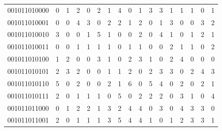 \documentclass[10pt,a4paper]{article}
\begin{document}
\begin{longtable}{ |c|c|c|c|c|c|c|c|c|c|c|c|c|c|c|c|c| }
    001011010000              & 0                            & 1                                & 2                            & 0                              & 2   & 1   & 4   & 0   & 1   & 3   & 3   & 1   & 1   & 1   & 0   & 1   \\
    001011010001              & 0                            & 0                                & 4                            & 3                              & 0   & 2   & 2   & 1   & 2   & 0   & 1   & 3   & 0   & 0   & 3   & 2   \\
    001011010010              & 3                            & 0                                & 0                            & 1                              & 5   & 1   & 0   & 0   & 2   & 0   & 4   & 1   & 0   & 1   & 2   & 1   \\
    001011010011              & 0                            & 0                                & 1                            & 1                              & 1   & 1   & 0   & 1   & 1   & 0   & 0   & 2   & 1   & 1   & 0   & 2   \\
    001011010100              & 1                            & 2                                & 0                            & 0                              & 3   & 1   & 0   & 2   & 3   & 1   & 0   & 2   & 4   & 0   & 0   & 0   \\
    001011010101              & 2                            & 3                                & 2                            & 0                              & 0   & 1   & 1   & 2   & 0   & 2   & 3   & 3   & 0   & 2   & 4   & 3   \\
    001011010110              & 5                            & 0                                & 2                            & 0                              & 0   & 2   & 1   & 6   & 0   & 5   & 4   & 0   & 2   & 0   & 2   & 1   \\
    001011010111              & 2                            & 0                                & 1                            & 1                              & 1   & 0   & 5   & 0   & 2   & 2   & 2   & 0   & 3   & 1   & 0   & 4   \\
    001011011000              & 0                            & 1                                & 2                            & 2                              & 1   & 3   & 2   & 4   & 4   & 0   & 3   & 0   & 4   & 3   & 3   & 0   \\
    001011011001              & 2                            & 0                                & 1                            & 1                              & 1   & 3   & 5   & 4   & 4   & 1   & 0   & 1   & 2   & 3   & 3   & 1   \\

\end{longtable}
\end{document}
